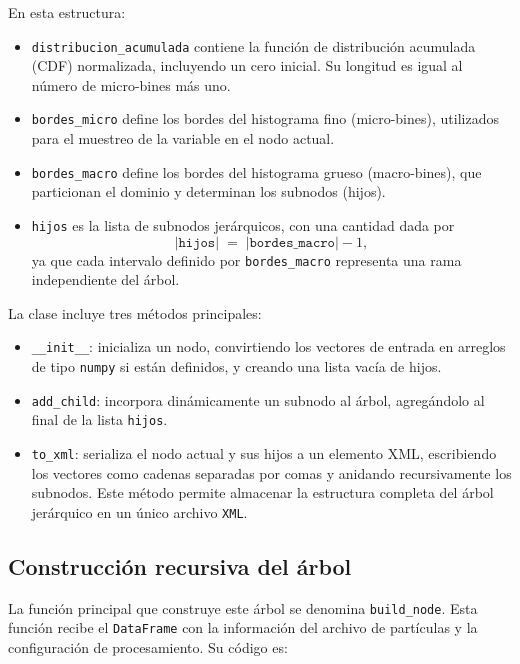 \noindent En esta estructura:
\begin{itemize}
    \item \texttt{distribucion\_acumulada} contiene la función de distribución acumulada (CDF) normalizada, incluyendo un cero inicial. Su longitud es igual al número de micro-bines más uno.
    \item \texttt{bordes\_micro} define los bordes del histograma fino (micro-bines), utilizados para el muestreo de la variable en el nodo actual.
    \item \texttt{bordes\_macro} define los bordes del histograma grueso (macro-bines), que particionan el dominio y determinan los subnodos (hijos).
    \item \texttt{hijos} es la lista de subnodos jerárquicos, con una cantidad dada por
    \[
        \lvert \texttt{hijos} \rvert \;=\; \lvert \texttt{bordes\_macro} \rvert - 1,
    \]
    ya que cada intervalo definido por \texttt{bordes\_macro} representa una rama independiente del árbol.
\end{itemize}

\noindent La clase incluye tres métodos principales:
\begin{itemize}
    \item \texttt{\_\_init\_\_}: inicializa un nodo, convirtiendo los vectores de entrada en arreglos de tipo \texttt{numpy} si están definidos, y creando una lista vacía de hijos.
    \item \texttt{add\_child}: incorpora dinámicamente un subnodo al árbol, agregándolo al final de la lista \texttt{hijos}.
    \item \texttt{to\_xml}: serializa el nodo actual y sus hijos a un elemento XML, escribiendo los vectores como cadenas separadas por comas y anidando recursivamente los subnodos. Este método permite almacenar la estructura completa del árbol jerárquico en un único archivo \texttt{XML}.
\end{itemize}

\subsection{Construcción recursiva del árbol}\label{subsec:build_node}

La función principal que construye este árbol se denomina \texttt{build\_node}. Esta función recibe el \texttt{DataFrame} con la información del archivo de partículas y la configuración de procesamiento. Su código es:

